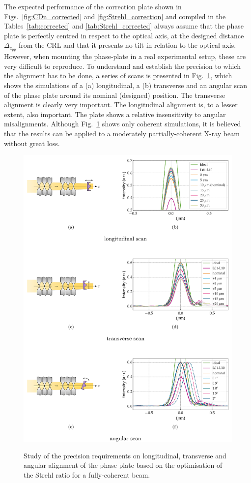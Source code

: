 \begin{refsection}
The expected performance of the correction plate shown in Figs.~\ref{fig:CDn_corrected} and \ref{fig:Strehl_correction} and compiled in the Tables~\ref{tab:corrected} and \ref{tab:Strehl_corrected} always assume that the phase plate is perfectly centred in respect to the optical axis, at the designed distance $\Delta_{z_\text{pp}}$ from the CRL and that it presents no tilt in relation to the optical axis. However, when mounting the phase-plate in a real experimental setup, these are very difficult to reproduce. To understand and establish the precision to which the alignment has to be done, a series of scans is presented in Fig.~\ref{fig:tolerancing}, which shows the simulations of a (a) longitudinal, a (b) transverse and an angular scan of the phase plate around its nominal (designed) position. The transverse alignment is clearly very important. The longitudinal alignment is, to a lesser extent, also important. The plate shows a relative insensitivity to angular misalignments. Although Fig.~\ref{fig:tolerancing} shows only coherent simulations, it is believed that the results can be applied to a moderately partially-coherent X-ray beam without great loss.

\begin{figure}[h]
        \centering
        {\includegraphics[width=0.7\linewidth]{figures/ch06/sensitivity_test.pdf}}
        \caption[Alignment sensitivity scan for the corrected system]{Study of the precision requirements on longitudinal, transverse and angular alignment of the phase plate based on the optimisation of the Strehl ratio for a fully-coherent beam.}\label{fig:tolerancing}
\end{figure}


\end{refsection}
